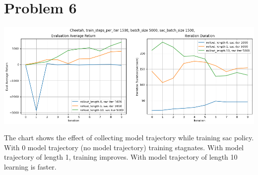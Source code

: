 \documentclass[11pt]{article}
\begin{document}
    \section*{Problem 6}

    \hspace*{-0.6in}
    \includegraphics[scale=0.5]{q6/q6}

    The chart shows the effect of collecting model trajectory while training sac policy.
    With 0 model trajectory (no model trajectory) training stagnates.
    With model trajectory of length 1, training improves.
    With model trajectory of length 10 learning is faster.
\end{document}
